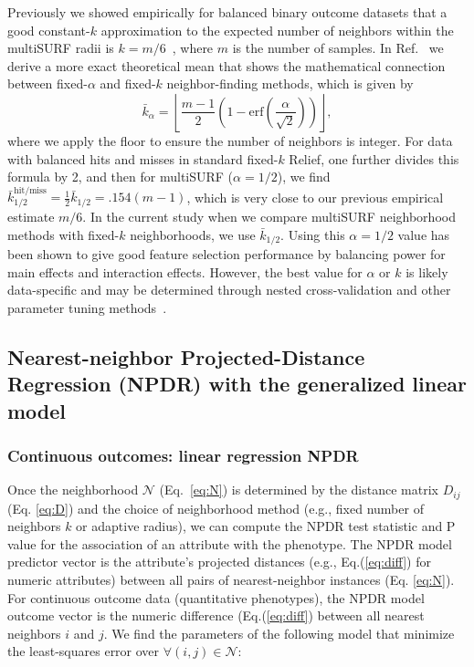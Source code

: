 \documentclass[10pt]{article}
\begin{document}
Previously we showed empirically for balanced binary outcome datasets that a good constant-$k$ approximation to the expected number of neighbors within the multiSURF radii is $k=m/6$~\cite{stir}, where $m$ is the number of samples. In Ref.~\cite{bod} we derive a more exact theoretical mean that shows the mathematical connection between fixed-$\alpha$ and fixed-$k$ neighbor-finding methods, which is given by 
\begin{equation}\label{eq:kbar}
{\bar{k}}_{\alpha} = \left \lfloor \frac{m-1}{2}  \left( 1 - \mathrm{erf}\left( \frac{\alpha}{\sqrt{2}} \right) \right) \right \rfloor,
\end{equation}
where we apply the floor to ensure the number of neighbors is integer. For data with balanced hits and misses in standard fixed-$k$ Relief, one further divides this formula by 2, and then for multiSURF ($\alpha=1/2$), we find $\bar{k}_{1/2}^{\text{hit/miss}} = \frac{1}{2}\bar{k}_{1/2} = .154 (m-1)$, which is very close to our previous empirical estimate $m/6$. In the current study when we compare multiSURF neighborhood methods with fixed-$k$ neighborhoods, we use $\bar{k}_{1/2}$. Using this $\alpha=1/2$ value has been shown to give good feature selection performance by balancing power for main effects and interaction effects. However, the best value for $\alpha$ or $k$ is likely data-specific and may be determined through nested cross-validation and other parameter tuning methods~\cite{bod}. 

\subsection{Nearest-neighbor Projected-Distance Regression (NPDR) with the generalized linear model}

\subsubsection{Continuous outcomes: linear regression NPDR}\label{sec:regress}

Once the neighborhood $\mathcal{N}$ (Eq.~\ref{eq:N}) is determined by the distance matrix $D_{ij}$ (Eq. \ref{eq:D}) and the choice of neighborhood method (e.g., fixed number of neighbors $k$ or adaptive radius), we can compute the NPDR test statistic and P value for the association of an attribute with the phenotype. The NPDR model predictor vector is the attribute's projected distances (e.g., Eq.(\ref{eq:diff}) for numeric attributes) between all pairs of nearest-neighbor instances (Eq. \ref{eq:N}). For continuous outcome data (quantitative phenotypes), the NPDR model outcome vector is the numeric difference (Eq.(\ref{eq:diff}) between all nearest neighbors $i$ and $j$. We find the parameters of the following model that minimize the least-squares error over $\forall(i,j) \in \mathcal{N}$: 
\end{document}

